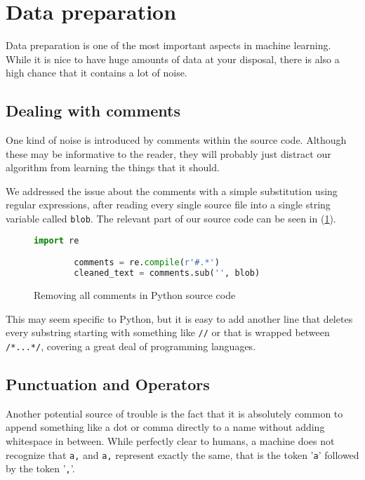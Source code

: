 \section{Data preparation} \label{sec:data_preparation}

  Data preparation is one of the most important aspects in machine
  learning.  While it is nice to have huge amounts of data at your
  disposal, there is also a high chance that it contains a lot of noise.

  \subsection{Dealing with comments} \label{sub:dealing_with_comments}

    One kind of noise is introduced by comments within the source
    code. Although these may be informative to the reader, they will
    probably just distract our algorithm from learning the things that
    it should.

    We addressed the issue about the comments with a simple substitution
    using regular expressions, after reading every single source file
    into a single string variable called \verb+blob+. The relevant part
    of our source code can be seen in (\ref{fig:comments}).

    \begin{figure}[htpb]
      \centering \begin{lstlisting}[language=Python]
        import re

        comments = re.compile(r'#.*')
        cleaned_text = comments.sub('', blob) \end{lstlisting} 
        \caption{Removing all comments in Python source
      code} \label{fig:comments}
    \end{figure}

    This may seem specific to Python, but it is easy to add another line
    that deletes every substring starting with something like \verb+//+
    or that is wrapped between \verb+/*...*/+, covering a great deal of
    programming languages.

  \subsection{Punctuation and Operators}
  \label{sub:punctuation_and_operators}

    Another potential source of trouble is the fact that it is
    absolutely common to append something like a dot or comma directly
    to a name without adding whitespace in between. While perfectly
    clear to humans, a machine does not recognize that \verb+a,+ and
    \verb+a+\textvisiblespace\verb+,+ represent exactly the same, that is
    the token '\verb+a+' followed by the token '\verb+,+'.

